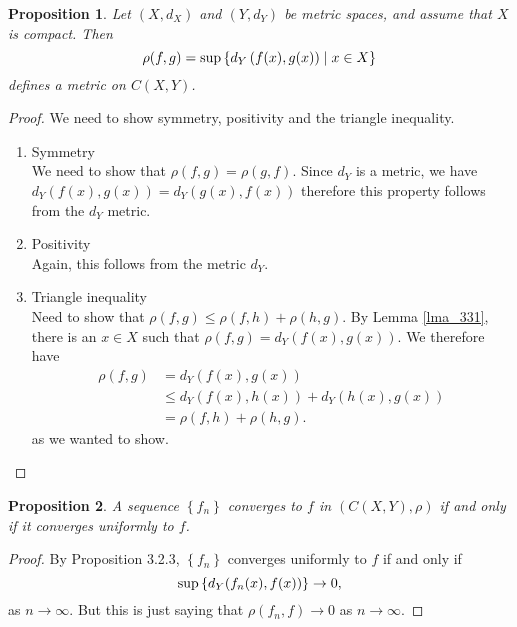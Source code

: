 \documentclass[a4paper]{report}
\newtheorem{prp}{Proposition}
\theoremstyle{definition}
\begin{document}
\begin{prp}
  \label{prp_332}
  Let $(X, d_X)$ and $(Y, d_Y)$ be metric spaces, and assume that $X$ is
  compact. Then
  \begin{equation}
    \notag
    \rho(f, g) = \sup\left\{ d_{Y}\left( f(x), g(x) \right) \mid x \in X\right\}
  \end{equation}
  defines a metric on $C\left( X, Y \right)$.
\end{prp}
\begin{proof}
  We need to show symmetry, positivity and the triangle inequality.  
  \begin{enumerate}
    \item Symmetry \\
      [0.2cm]
      We need to show that $\rho(f, g) = \rho(g, f)$. Since $d_Y$ is a metric,
      we have $d_Y(f(x), g(x)) = d_Y(g(x), f(x))$ therefore this property
      follows from the $d_Y$ metric.

    \item Positivity \\
      [0.2cm]
      Again, this follows from the metric $d_Y$.     

    \item Triangle inequality \\
      [0.2cm]
      Need to show that $\rho(f, g) \leq \rho(f, h) + \rho(h, g)$.
      By Lemma \ref{lma_331}, there is an $x \in X$ such that $\rho(f, g) = d_Y(f(x), g(x))$. 
      We therefore have
      \begin{align*}
        \rho(f, g) &= d_Y(f(x), g(x)) \\
        &\leq d_Y(f(x), h(x)) + d_Y(h(x), g(x)) \\
        &= \rho(f, h) + \rho(h, g).
      \end{align*}
      as we wanted to show.
  \end{enumerate}
\end{proof}

\begin{prp}
  \label{prp_333}
  A sequence $\left\{ f_n \right\}$ converges to $f$ in $\left( C(X, Y), \rho
  \right)$ if and only if it converges uniformly to $f$.
\end{prp}
\begin{proof}
  By Proposition 3.2.3, $\left\{ f_n \right\}$ converges uniformly to $f$ if
  and only if 
  \begin{equation}
    \notag
    \sup\left\{ d_Y(f_n(x), f(x)) \right\} \rightarrow 0, 
  \end{equation}
  as $n \rightarrow \infty$. But this is just saying that $\rho(f_n, f) \rightarrow
  0$ as $n \rightarrow \infty$.
\end{proof}
\end{document}
